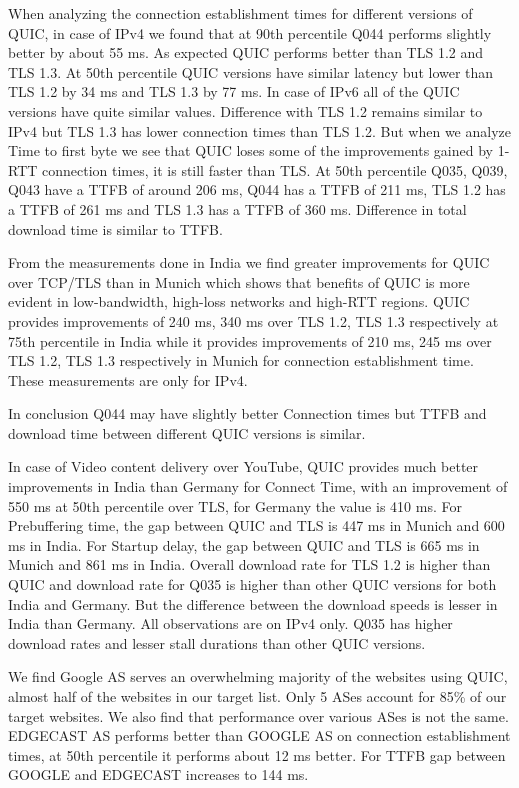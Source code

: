 \begin{frame}[allowframebreaks]

When analyzing the connection establishment times for different versions of QUIC, in case of IPv4 we found that at 90th percentile Q044 performs slightly better by about 55 ms. As expected QUIC performs better than TLS 1.2 and TLS 1.3. At 50th percentile QUIC versions have similar latency but lower than TLS 1.2 by 34 ms and TLS 1.3 by 77 ms.
In case of IPv6 all of the QUIC versions have quite similar values. Difference with TLS 1.2 remains similar to IPv4 but TLS 1.3 has lower connection times than TLS 1.2. But when we analyze Time to first byte we see that QUIC loses some of the improvements gained by 1-RTT connection times, it is still faster than TLS. At 50th percentile Q035, Q039, Q043 have a TTFB of around 206 ms, Q044 has a TTFB of 211 ms, TLS 1.2 has a TTFB of 261 ms and TLS 1.3 has a TTFB of 360 ms. Difference in total download time is similar to TTFB.

From the measurements done in India we find greater improvements for QUIC over TCP/TLS than in Munich which shows that benefits of QUIC is more evident in low-bandwidth, high-loss networks and high-RTT regions. QUIC provides improvements of 240 ms, 340 ms over TLS 1.2, TLS 1.3 respectively at 75th percentile in India while it provides improvements of 210 ms, 245 ms over TLS 1.2, TLS 1.3 respectively in Munich for connection establishment time. These measurements are only for IPv4.

In conclusion Q044 may have slightly better Connection times but TTFB and download time between different QUIC versions is similar.

In case of Video content delivery over YouTube, QUIC provides much better improvements in India than Germany for Connect Time, with an improvement of 550 ms at 50th percentile  over TLS, for Germany the value is 410 ms. For Prebuffering time, the gap between QUIC and TLS is 447 ms in Munich and 600 ms in India. 
For Startup delay, the gap between QUIC and TLS is 665 ms in Munich and 861 ms in India.
Overall download rate for TLS 1.2 is higher than QUIC and download rate for Q035 is higher than other QUIC versions for both India and Germany. But the difference between the download speeds is lesser in India than Germany. All observations are on IPv4 only. Q035 has higher download rates and lesser stall durations than other QUIC versions.

We find Google AS serves an overwhelming majority of the websites using QUIC, almost half of the websites in our target list. Only 5 ASes account for 85\% of our target websites. We also find that performance over various ASes is not the same. EDGECAST AS performs better than GOOGLE AS on connection establishment times, at 50th percentile it performs about 12 ms better. For TTFB gap between GOOGLE and EDGECAST increases to 144 ms. 


\end{frame}
